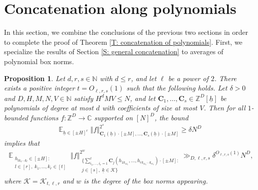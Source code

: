 \documentclass[11pt]{amsart}
\newtheorem{proposition}[lemma]{Proposition}
\theoremstyle{definition}
\DeclareMathOperator*{\E}{\mathbb{E}}
\newcommand{\C}{{\mathbb C}}
\newcommand{\N}{{\mathbb N}}
\newcommand{\Z}{{\mathbb Z}}
\newcommand{\CK}{{\mathcal K}}
\newcommand{\bc}{{\textbf{C}}}
\newcommand{\uh}{{\underline{h}}}
\newcommand{\uk}{{\underline{k}}}
\newcommand{\norm}[1]{\left\Vert #1\right\Vert}
\begin{document}
\section{Concatenation along polynomials}\label{S: concatenation along polys}
In this section, we combine the conclusions of the previous two sections in order to complete the proof of Theorem \ref{T: concatenation of polynomials}. First, we specialize the results of Section \ref{S: general concatenation} to averages of polynomial box norms.
\begin{proposition}\label{P: concatenation of polynomials I}
    Let $d, r, s\in\N$ with $d\leq r$, and let $\ell$ be a power of $2$. There exists a positive integer $t=O_{\ell, r, s}(1)$ such that the following holds.  Let $\delta>0$ and $D, H, M, N, V\in\N$ satisfy $H^d M V \leq N$, and let $\bc_1, \ldots, \bc_s\in\Z^D[\uh]$ be polynomials of degree at most $d$ with coefficients of size at most $V$.  Then for all $1$-bounded functions $f:\Z^D\to\C$ supported on $[N]^D$, the bound
    \begin{align}
        \E_{\uh\in[\pm H]^r}\norm{f}_{\bc_1(\uh)\cdot[\pm M], \ldots, \bc_s(\uh)\cdot[\pm M]}^{2^s}\geq \delta N^D
    \end{align}
    implies that
        \begin{align*}
        \E_{\substack{h_{lk_1\cdots k_l}\in[\pm H]:\\ l\in[r],\; k_1, \ldots, k_r\in[t]}}
        \norm{f}_{\substack{\{\sum_{i_1, \ldots, i_r=1}^{\ell}\bc_j(h_{1k_{1i_1}}, \ldots, h_{rk_{1i_1}\cdots k_{ri_r}})\cdot[\pm M]:\\ j\in[s],\; \uk \in \CK
 \}}}^{2^{w}} \gg_{D, \ell, r, s} \delta^{O_{\ell, r, s}(1)} N^D,
    \end{align*}
    where $\CK=\CK_{t,\ell,r}$ and $w$ is the degree of the box norms appearing.
\end{proposition}
\end{document}
